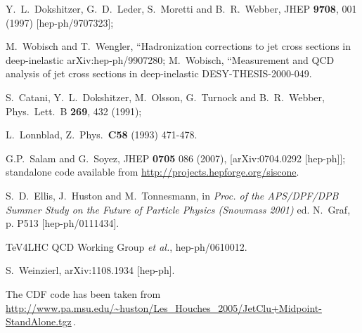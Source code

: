 \documentclass[12pt,a4]{article}
\begin{document}
\begin{thebibliography}{99}
  Y.~L.~Dokshitzer, G.~D.~Leder, S.~Moretti and B.~R.~Webber,
  JHEP {\bf 9708}, 001 (1997)
  [hep-ph/9707323];

  M.~Wobisch and T.~Wengler,
   ``Hadronization corrections to jet cross sections in deep-inelastic
  arXiv:hep-ph/9907280;
  M.~Wobisch,
   ``Measurement and QCD analysis of jet cross sections in deep-inelastic
DESY-THESIS-2000-049.

  S.~Catani, Y.~L.~Dokshitzer, M.~Olsson, G.~Turnock and B.~R.~Webber,
  Phys.\ Lett.\ B {\bf 269}, 432 (1991);

  L.~Lonnblad,
  Z.\ Phys.\  {\bf C58 } (1993)  471-478.


  G.P.~Salam and G.~Soyez,
  JHEP {\bf 0705} 086 (2007),
  [arXiv:0704.0292 [hep-ph]]; 
standalone code available from \url{http://projects.hepforge.org/siscone}.


  S.~D.~Ellis, J.~Huston and M.~Tonnesmann,
in {\it Proc. of the APS/DPF/DPB Summer Study on the Future of
  Particle Physics (Snowmass 2001) } ed. N.~Graf, p. P513
  [hep-ph/0111434].

  TeV4LHC QCD Working Group {\it et al.},
  hep-ph/0610012.

  S.~Weinzierl,
  arXiv:1108.1934 [hep-ph].


 The CDF code has been taken from \\
  \url{http://www.pa.msu.edu/~huston/Les_Houches_2005/JetClu+Midpoint-StandAlone.tgz}\,.


\end{thebibliography}
\end{document}
